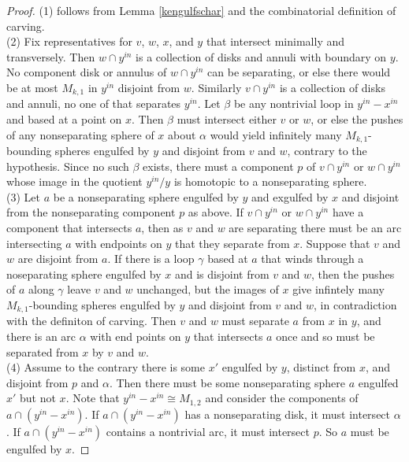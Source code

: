 \begin{proof}
  (1) follows from Lemma \ref{kengulfschar} and the combinatorial definition of carving.\\
  (2) Fix representatives for $v$, $w$, $x$, and $y$ that intersect minimally and transversely.
  Then $w\cap y^{in}$ is a collection of disks and annuli with boundary on $y$.
  No component disk or annulus of $w\cap y^{in}$ can be separating,
  or else there would be at most $M_{k,1}$ in $y^{in}$
  disjoint from $w$.
  Similarly $v\cap y^{in}$ is a collection of disks and annuli, no one of that separates $y^{in}$.
  Let $\beta$ be any nontrivial loop in $y^{in}-x^{in}$ and based at
  a point on $x$.
  Then $\beta$ must intersect either $v$ or $w$, or else
  the pushes of any nonseparating sphere of $x$ about $\alpha$
  would yield infinitely many $M_{k,1}$-bounding spheres engulfed by $y$
  and disjoint from $v$ and $w$, contrary to the hypothesis.
  Since no such $\beta$ exists,
  there must a component $p$ of $v\cap y^{in}$ or $w\cap y^{in}$
  whose image in the quotient
  $y^{in}/y$ is homotopic to a nonseparating sphere.\\
  (3) Let $a$ be a nonseparating sphere engulfed by $y$ and exgulfed by $x$
  and disjoint from the nonseparating component $p$ as above.
  If $v\cap y^{in}$ or $w\cap y^{in}$
  have a component that intersects $a$, then as $v$ and $w$ are separating there
  must be an arc intersecting $a$ with endpoints on $y$ that they separate from $x$.
  Suppose that $v$ and $w$ are disjoint from $a$.
  If there is a loop $\gamma$ based at $a$ that winds through a noseparating sphere engulfed by $x$
  and is disjoint from $v$ and $w$,
  then the pushes of $a$ along $\gamma$ leave $v$ and $w$ unchanged,
  but the images of $x$ give infintely many $M_{k,1}$-bounding spheres
  engulfed by $y$ and disjoint from $v$ and $w$, in contradiction
  with the definiton of carving.
  Then $v$ and $w$ must separate $a$ from $x$ in $y$, and there is an
  arc $\alpha$ with end points on $y$ that intersects $a$ once and
  so must be separated from $x$ by $v$ and $w$.\\
  (4) Assume to the contrary there is some $x'$ engulfed by $y$,
   distinct from $x$,
   and disjoint from $p$ and $\alpha$.
   Then there must be some nonseparating sphere $a$ engulfed $x'$ but not $x$.
   Note that $y^{in}-x^{in} \cong M_{1,2}$
   and consider the components of $a \cap (y^{in}-x^{in})$.
   If $a \cap (y^{in}-x^{in})$ has a nonseparating disk,
   it must intersect $\alpha$.
   If $a \cap (y^{in}-x^{in})$ contains a nontrivial arc,
   it must intersect $p$. So $a$ must be engulfed by $x$.
\end{proof}

